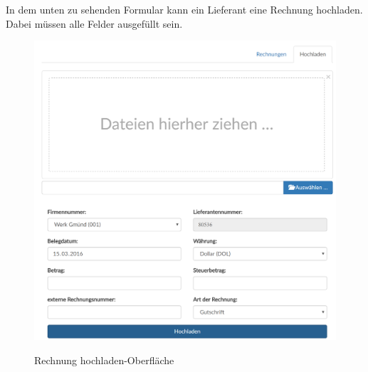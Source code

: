 \newpage
In dem unten zu sehenden Formular kann ein Lieferant eine Rechnung hochladen. Dabei müssen alle Felder ausgefüllt sein.
\begin{figure}[!h]
    \centering
    \includegraphics[width=17cm]{figures/upload.png}
    \label{fig:takebill}
    \caption{Rechnung hochladen-Oberfläche}
\end{figure}

